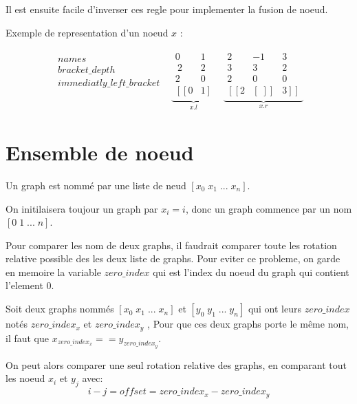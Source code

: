 \documentclass[]{article}
\begin{document}
\noindent Il est ensuite facile d'inverser ces regle pour implementer la fusion de noeud.

\noindent Exemple de representation d'un noeud $x$ :

\[
\begin{matrix}
 \begin{matrix}
 names \\
 bracket\_depth \\ 
 immediatly\_left\_bracket \\
 \;
 \end{matrix} & \underbrace{\begin{matrix}
  0 & 1 \\\:
 2 & 2 \\
 2 & 0 \\
 \left[\left[0 \right.\right. & \left. 1 \right]
 \end{matrix}}_{x.l} & \underbrace{\begin{matrix}
2 & -1 & 3 \\
3 & 3 & 2 \\
2 & 0 & 0 \\
\left[\left[2 \right.\right. & \left.\left[\;\right]\right] & \left.\left. 3 \right]\right]
 \end{matrix}}_{x.r}
 \end{matrix}
\]

\section{Ensemble de noeud}

Un graph est nommé par une liste de neud $ \left[ x_0 \; x_1 \; ... \; x_{n} \right] $. \hfill \break

\noindent On initilaisera toujour un graph par $x_i = i$, donc un graph commence par un nom $ \left[ 0 \; 1 \; ... \; n \right] $. \hfill \break

\noindent Pour comparer les nom de deux graphs, il faudrait comparer toute les rotation relative possible des les deux liste de graphs. Pour eviter ce probleme, on garde en memoire la variable $zero\_index$ qui est l'index du noeud du graph qui contient l'element 0. \hfill \break

\noindent Soit deux graphs nommés $ \left[x_0 \; x_1 \; ... \; x_n \right] $ et $ \left[y_0 \; y_1 \; ... \; y_n \right] $ qui ont leurs $zero\_index$ notés $zero\_index_x$ et $zero\_index_y$ , Pour que ces deux graphs porte le même nom, il faut que $x_{zero\_index_x} == y_{zero\_index_y}$. \hfill \break

\noindent On peut alors comparer une seul rotation relative des graphs, en comparant tout les noeud $x_i$ et $y_j$ avec:
\[i - j = offset = zero\_index_x - zero\_index_y\]
\end{document}
